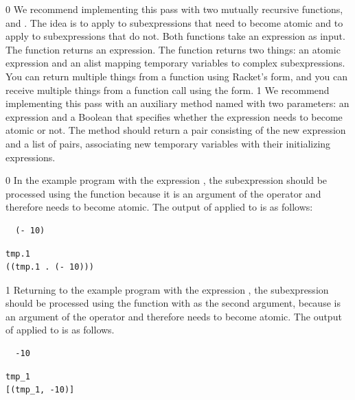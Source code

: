 \documentclass[7x10]{TimesAPriori_MIT}%
\def\racketEd{0}
\def\pythonEd{1}
\def\edition{1}
\newcommand{\pythonColor}[0]{}
\numberwithin{theorem}{chapter}
\numberwithin{definition}{chapter}
\numberwithin{equation}{chapter}
\begin{document}
{\if\edition\racketEd
We recommend implementing this pass with two mutually recursive
functions,  and . The idea is to apply
 to subexpressions that need to become atomic and to
apply  to subexpressions that do not.  Both functions
take an \LangVar{} expression as input.  The  function
returns an expression.  The  function returns two
things: an atomic expression and an alist mapping temporary variables to
complex subexpressions. You can return multiple things from a function
using Racket's  form, and you can receive multiple things
from a function call using the  form.
\fi}
%
{\if\edition\pythonEd\pythonColor
%
We recommend implementing this pass with an auxiliary method named
 with two parameters: an \LangVar{} expression and a
Boolean that specifies whether the expression needs to become atomic
or not.  The  method should return a pair consisting of
the new expression and a list of pairs, associating new temporary
variables with their initializing expressions.
%
\fi}

{\if\edition\racketEd
%
In the example program with the expression , the subexpression  should be processed using the
 function because it is an argument of the \code{+}
operator and therefore needs to become atomic.  The output of
 applied to  is as follows:
\begin{transformation}
\begin{lstlisting}
  (- 10)
\end{lstlisting}
\compilesto
\begin{lstlisting}
tmp.1
((tmp.1 . (- 10)))
\end{lstlisting}
\end{transformation}
\fi}
%
{\if\edition\pythonEd\pythonColor
%
Returning to the example program with the expression ,
the subexpression  should be processed using the
 function with  as the second argument,
because  is an argument of the \code{+} operator and
therefore needs to become atomic.  The output of 
applied to  is as follows.
\begin{transformation}
\begin{lstlisting}
  -10
\end{lstlisting}
\compilesto
\begin{lstlisting}
tmp_1
[(tmp_1, -10)]
\end{lstlisting}
\end{transformation}
%  
\fi}
\end{document}
